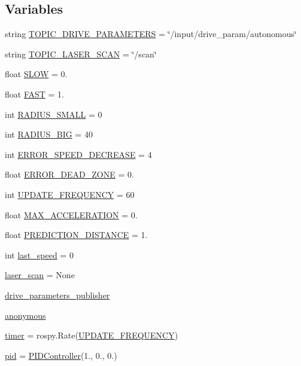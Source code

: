\subsection*{Variables}
\begin{DoxyCompactItemize}
\item 
string \hyperlink{namespacewallfollowing_a765ce45df7d0c3d9134fc83534029e36}{T\+O\+P\+I\+C\+\_\+\+D\+R\+I\+V\+E\+\_\+\+P\+A\+R\+A\+M\+E\+T\+E\+RS} = \char`\"{}/input/drive\+\_\+param/autonomous\char`\"{}
\item 
string \hyperlink{namespacewallfollowing_a7e38e617465ebdfa7ec0576ac63443f8}{T\+O\+P\+I\+C\+\_\+\+L\+A\+S\+E\+R\+\_\+\+S\+C\+AN} = \char`\"{}/scan\char`\"{}
\item 
float \hyperlink{namespacewallfollowing_a30a4013dbd3a6ea5275fbed3fe35da22}{S\+L\+OW} = 0.
\item 
float \hyperlink{namespacewallfollowing_ab1e7c06b4efb8e38a97ac8ec783a6beb}{F\+A\+ST} = 1.
\item 
int \hyperlink{namespacewallfollowing_aa59c6dfd10cb4f1550367b3268417436}{R\+A\+D\+I\+U\+S\+\_\+\+S\+M\+A\+LL} = 0
\item 
int \hyperlink{namespacewallfollowing_a4b502375f79f9fcc2a823cc60da7bee0}{R\+A\+D\+I\+U\+S\+\_\+\+B\+IG} = 40
\item 
int \hyperlink{namespacewallfollowing_a205d8fd2e51cc16818cb679f6c87c861}{E\+R\+R\+O\+R\+\_\+\+S\+P\+E\+E\+D\+\_\+\+D\+E\+C\+R\+E\+A\+SE} = 4
\item 
float \hyperlink{namespacewallfollowing_ac87d5f143cfd44f170a1d385ebd1a71b}{E\+R\+R\+O\+R\+\_\+\+D\+E\+A\+D\+\_\+\+Z\+O\+NE} = 0.
\item 
int \hyperlink{namespacewallfollowing_a7ba7bea964894fd6f3def270bd3afa43}{U\+P\+D\+A\+T\+E\+\_\+\+F\+R\+E\+Q\+U\+E\+N\+CY} = 60
\item 
float \hyperlink{namespacewallfollowing_acc4e21a1971c33663609d022c899c167}{M\+A\+X\+\_\+\+A\+C\+C\+E\+L\+E\+R\+A\+T\+I\+ON} = 0.
\item 
float \hyperlink{namespacewallfollowing_a40e67d731c86a71ce7d1b8c17bff0514}{P\+R\+E\+D\+I\+C\+T\+I\+O\+N\+\_\+\+D\+I\+S\+T\+A\+N\+CE} = 1.
\item 
int \hyperlink{namespacewallfollowing_a9ee8d77a4629b5d8ecb2899da6e3a7fe}{last\+\_\+speed} = 0
\item 
\hyperlink{namespacewallfollowing_a35ff373c811db70d98205347a736c606}{laser\+\_\+scan} = None
\item 
\hyperlink{namespacewallfollowing_aa69138defbbc5f21e99db50a6b3c903f}{drive\+\_\+parameters\+\_\+publisher}
\item 
\hyperlink{namespacewallfollowing_a005968f85117845c036ef1cbd61034bb}{anonymous}
\item 
\hyperlink{namespacewallfollowing_a57288dd797e0bd15012f3ebf1670ce38}{timer} = rospy.\+Rate(\hyperlink{namespacewallfollowing_a7ba7bea964894fd6f3def270bd3afa43}{U\+P\+D\+A\+T\+E\+\_\+\+F\+R\+E\+Q\+U\+E\+N\+CY})
\item 
\hyperlink{namespacewallfollowing_adc9f95e0b626be8ddae98a596a38e7e8}{pid} = \hyperlink{classwallfollowing_1_1_p_i_d_controller}{P\+I\+D\+Controller}(1., 0., 0.)
\end{DoxyCompactItemize}


